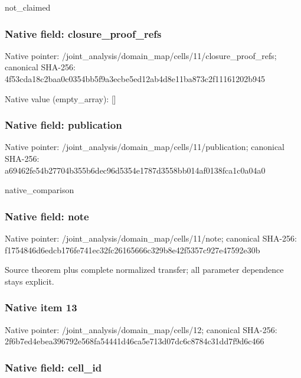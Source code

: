 \documentclass[10pt,a4paper]{article}
\begin{document}
not\_claimed


\subsubsection{Native field: closure\_proof\_refs}


Native pointer: /joint\_analysis/domain\_m\allowbreak{}ap/cells/11/closure\_proo\allowbreak{}f\_refs; canonical SHA-256: 4f53cda18c2baa0c0354bb5f\allowbreak{}9a3ecbe5ed12ab4d8e11ba87\allowbreak{}3c2f11161202b945



Native value (empty\_array): []



\subsubsection{Native field: publication}


Native pointer: /joint\_analysis/domain\_m\allowbreak{}ap/cells/11/publication; canonical SHA-256: a69462fe54b27704b355b6de\allowbreak{}c96d5354e1787d3558bb014a\allowbreak{}f0138fca1c0a04a0


native\_comparison


\subsubsection{Native field: note}


Native pointer: /joint\_analysis/domain\_m\allowbreak{}ap/cells/11/note; canonical SHA-256: f1754846d6edcb176fe741ec\allowbreak{}32fc26165666c329b8e42f53\allowbreak{}57c927e47592e30b


Source theorem plus complete normalized transfer; all parameter dependence stays explicit.


\subsubsection{Native item 13}


Native pointer: /joint\_analysis/domain\_map/cells/12; canonical SHA-256: 2f6b7ed4ebea396792e568fa\allowbreak{}54441d46ca5e713d07dc6c87\allowbreak{}84c31dd7f9d6c466



\subsubsection{Native field: cell\_id}
\end{document}
